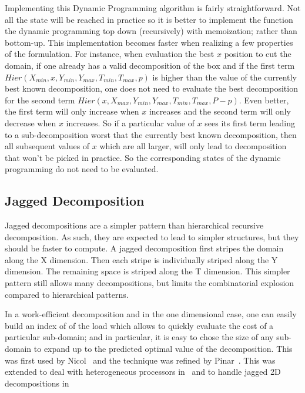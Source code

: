 \documentclass[10pt, conference, compsocconf]{IEEEtran}
\begin{document}
Implementing this Dynamic Programming algorithm is fairly straightforward.
Not all the state will be reached in practice so it is better
to implement the function the dynamic programming top down
(recursively) with memoization; rather than bottom-up. This
implementation becomes faster when realizing a few properties of the
formulation. For instance, when evaluation the best $x$ position to
cut the domain, if one already has a valid decomposition of the box
and if the first term $Hier(X_{min}, x, Y_{min}, Y_{max}, T_{min},
T_{max}, p)$ is higher than the value of the currently best known
decomposition, one does not need to evaluate the best decomposition
for the second term $Hier(x, X_{max}, Y_{min}, Y_{max}, T_{min},
T_{max}, P-p)$.  Even better, the first term will only increase when
$x$ increases and the second term will only decrease when $x$
increases. So if a particular value of $x$ sees its first term leading
to a sub-decomposition worst that the currently best known
decomposition, then all subsequent values of $x$ which are all larger,
will only lead to decomposition that won't be picked in practice. So
the corresponding states of the dynamic programming do not need to be evaluated.

\subsection{Jagged Decomposition}

Jagged decompositions are a simpler pattern than hierarchical
recursive decomposition. As such, they are expected to lead to simpler
structures, but they should be faster to compute. A jagged
decomposition first stripes the domain along the X dimension. Then
each stripe is individually striped along the Y dimension. The remaining
space is striped along the T dimension. This simpler pattern still allows
many decompositions, but limits the combinatorial explosion compared
to hierarchical patterns.

In a work-efficient decomposition and in the one dimensional case, one
can easily build an index of of the load which allows to quickly
evaluate the cost of a particular sub-domain; and in particular, it is
easy to chose the size of any sub-domain to expand up to the predicted
optimal value of the decomposition. This was first used by
Nicol~\cite{Nicol94} and the technique was refined by
Pinar~\cite{pinar04}. This was extended to deal with heterogeneous processors
in~\cite{pinar08} and to handle jagged 2D decompositions in~\cite{saule12-jpdc-spart}
\end{document}
